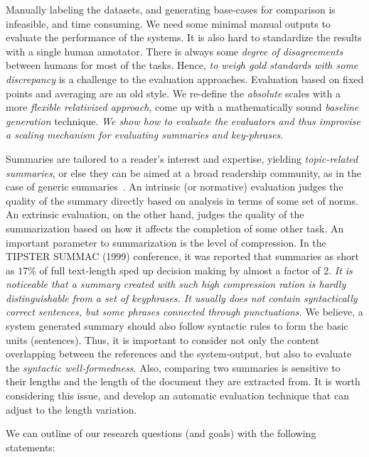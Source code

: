 \documentclass[a4paper]{report}
\begin{document}
\par Manually labeling the datasets, and generating base-cases for comparison is infeasible, and time consuming. We need some minimal manual outputs to evaluate the performance of the systems. It is also hard to standardize the results with a single human annotator. There is always some \emph{degree of disagreements} between humans for most of the tasks. Hence, \emph{to weigh gold standards with some discrepancy} is a challenge to the evaluation approaches. Evaluation based on fixed points and averaging are an old style. We re-define the \emph{absolute} scales with a more \emph{flexible relativized approach}, come up with a mathematically sound \emph{baseline generation} technique. \emph{We show how to evaluate the evaluators and thus improvise a scaling mechanism for evaluating summaries and key-phrases}.\\
\par Summaries are tailored to a reader's interest and expertise, yielding \emph{topic-related summaries}, or else they can be aimed at a broad readership community, as in the case of generic summaries~\cite{Mani99thetipster}.
An intrinsic (or normative) evaluation judges the quality of the summary directly based on analysis in terms of some set of norms. An extrinsic evaluation, on the other hand, judges the quality of the summarization based on how it affects the completion of some other task. An important parameter to summarization is the level of compression. In the TIPSTER SUMMAC (1999) conference, it was reported that summaries as short as $17\%$ of full text-length sped up decision making by almost a factor of 2. \emph{It is noticeable that a summary created with such high compression ration is hardly distinguishable from a set of keyphrases. It usually does not contain syntactically correct sentences, but some phrases connected through punctuations.} We believe,  a system generated summary should also follow syntactic rules to form the basic units (sentences).  Thus, it is important to consider not only the content overlapping between the references and the system-output, but also to evaluate the \emph{syntactic well-formedness}. Also, comparing two summaries is sensitive to their lengths and the length of the document they are extracted from. It is worth considering this issue, and develop an automatic evaluation technique that can adjust to the length variation.\\
\par We can outline of our research questions (and goals) with the following statements:
\end{document}
